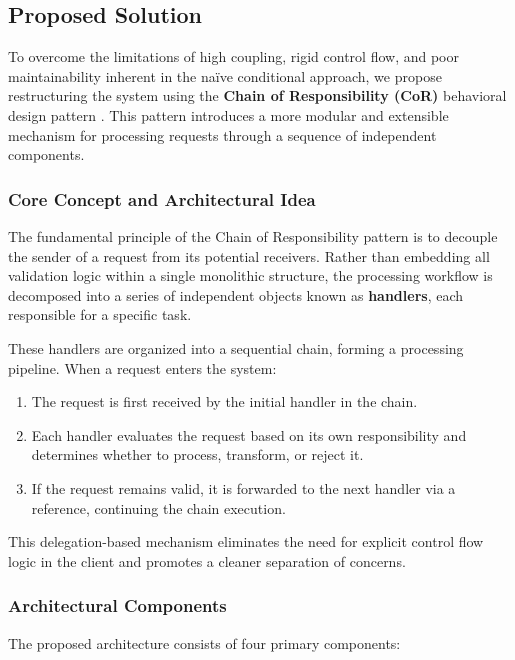 \subsection{Proposed Solution}

To overcome the limitations of high coupling, rigid control flow, and poor maintainability inherent in the naïve conditional approach, we propose restructuring the system using the \textbf{Chain of Responsibility (CoR)} behavioral design pattern \cite{gof1994}. This pattern introduces a more modular and extensible mechanism for processing requests through a sequence of independent components.

\subsubsection{Core Concept and Architectural Idea}
The fundamental principle of the Chain of Responsibility pattern is to decouple the sender of a request from its potential receivers. Rather than embedding all validation logic within a single monolithic structure, the processing workflow is decomposed into a series of independent objects known as \textbf{handlers}, each responsible for a specific task.

These handlers are organized into a sequential chain, forming a processing pipeline. When a request enters the system:

\begin{enumerate}
    \item The request is first received by the initial handler in the chain.
    \item Each handler evaluates the request based on its own responsibility and determines whether to process, transform, or reject it.
    \item If the request remains valid, it is forwarded to the next handler via a reference, continuing the chain execution.
\end{enumerate}

This delegation-based mechanism eliminates the need for explicit control flow logic in the client and promotes a cleaner separation of concerns.

\subsubsection{Architectural Components}
The proposed architecture consists of four primary components:

